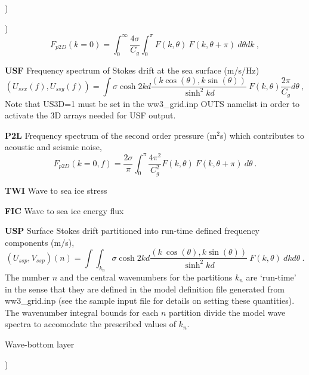 \begin{list}{)\hfill}
\begin{list}{)\hfill}
      \begin{equation} F_{p2D}(k=0) = \int_0^{\infty} \frac{4 \sigma}{C_g} \int_0^{\pi}  F(k,\theta) \:  F(k,\theta+\pi) \:  d\theta dk
      \: , \label{eq:sop} \end{equation}
\item \textbf{USF} Frequency spectrum of Stokes drift at the sea surface (m/s/Hz)
     \begin{equation} (U_{ssx}(f),U_{ssy}(f)) =  \int \sigma \cosh 2kd \frac{(k \cos(\theta),k \sin(\theta))}
        {\sinh^2 kd}  \: F(k,\theta) \frac{2 \pi}{C_g} d\theta
      \: , \label{eq:Ussf} \end{equation}
Note that US3D=1 must be set in the ww3\_grid.inp OUTS namelist in order to activate the 3D arrays needed for USF output.
\item \textbf{P2L} Frequency spectrum of the second order pressure (m$^2$s)  which contributes to acoustic and seismic noise,
      \begin{equation} F_{p2D}(k=0,f) =  \frac{2 \sigma}{\pi} \int_0^{\pi}  \frac{4 \pi^2}{C_g^2} F(k,\theta) \:  F(k,\theta+\pi) \:  d\theta
      \: . \label{eq:sopf} \end{equation}
\item \textbf{TWI}   Wave to sea ice stress
\item \textbf{FIC}   Wave to sea ice energy flux
\item \textbf{USP}   Surface Stokes drift partitioned into run-time defined frequency components (m/s),
      \begin{equation} (U_{ssp},V_{ssp})(n) =  \int \!\!\!\! \int_{k_n}  \sigma \cosh 2kd \frac{(k\
      \cos(\theta),k \sin(\theta))}
        {\sinh^2 kd}  \: F(k,\theta) \: dk d\theta
      \: . \label{eq:Ussp} \end{equation}
The number $n$ and the central wavenumbers for the partitions $k_n$ are `run-time' in the sense that they are defined in the model definition file generated from ww3\_grid.inp (see the sample input file for details on setting these quantities).  The wavenumber integral bounds for each $n$ partition divide the model wave spectra to accomodate the prescribed values of $k_n$.
\end{list}

\item{Wave-bottom layer}

\begin{list}{)\hfill}
            { \leftmargin 8mm 
             \rightmargin 0mm \itemsep 0mm \parsep 0mm}


\end{list}
\end{list}
